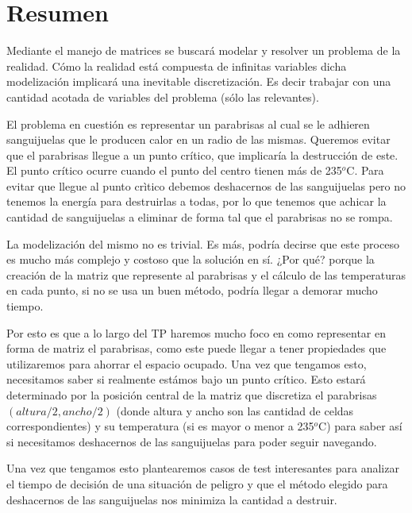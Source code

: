 \section{Resumen}

Mediante el manejo de matrices se buscará modelar y resolver un problema de la realidad. Cómo la realidad está compuesta de infinitas variables dicha modelización implicará una inevitable discretización. Es decir trabajar con una 
cantidad acotada de variables del problema (sólo las relevantes).

El problema en cuestión es representar un parabrisas al cual se le adhieren sanguijuelas que le producen calor en un radio de las mismas. Queremos evitar que el parabrisas llegue a un punto crítico, que implicaría la destrucción de este. El punto crítico ocurre cuando el punto del centro tienen más de 235${}^o$C. Para evitar que llegue al punto crìtico debemos deshacernos de las sanguijuelas pero no tenemos la energía para destruirlas a todas, por lo que tenemos que achicar la cantidad de sanguijuelas a eliminar de forma tal que el parabrisas no se rompa.

La modelización del mismo no es trivial. Es más, podría decirse que este proceso es mucho más complejo y costoso que la solución en sí. ¿Por qué? porque la creación de la matriz que represente al parabrisas y el cálculo de las temperaturas en cada punto, si no se usa un buen método, podría llegar a demorar mucho tiempo. 

Por esto es que a lo largo del TP haremos mucho foco en como representar en forma de matriz el parabrisas, como este puede llegar a tener propiedades que utilizaremos para ahorrar el espacio ocupado. Una vez que tengamos esto, necesitamos saber si realmente estámos bajo un punto crítico. Esto estará determinado por la posición central  de la matriz que discretiza el parabrisas $(altura/2,ancho/2)$ (donde altura y ancho son las cantidad de celdas correspondientes) y su temperatura (si es mayor o menor a 235${}^o$C) para saber así si necesitamos deshacernos de las sanguijuelas para poder seguir navegando.

Una vez que tengamos esto plantearemos casos de test interesantes para analizar el tiempo de decisión de una situación de peligro y que el método elegido para deshacernos de las sanguijuelas nos minimiza la cantidad a destruir.


